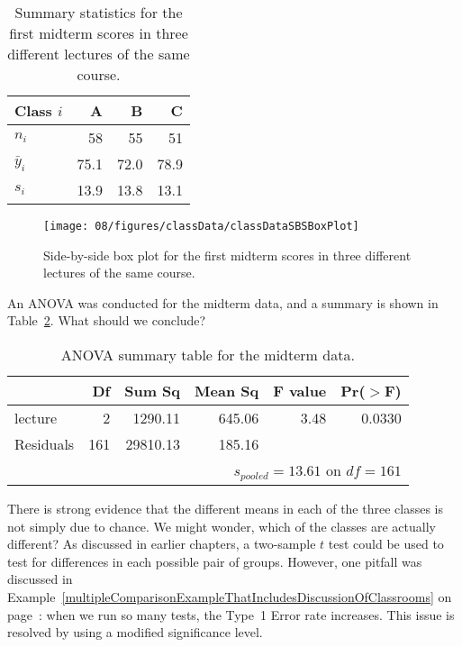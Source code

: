 \begin{table}[ht]
\centering
\begin{tabular}{lrrr}
  \hline
Class $i$	& A	& B	& C \\ 
  \hline
$n_i$		& 58	& 55	& 51 \\ 
$\bar{y}_i$	& 75.1	& 72.0	& 78.9 \\ 
$s_i$		& 13.9	& 13.8	& 13.1 \\ 
\hline
\end{tabular}
\caption{Summary statistics for the first midterm scores in three different lectures of the same course.}
\label{summaryStatisticsForClassTestData}
\end{table}

\begin{figure}[ht]
\centering
\texttt{[image: 08/figures/classData/classDataSBSBoxPlot]}
\caption{Side-by-side box plot for the first midterm scores in three different  lectures of the same course.}
\label{classDataSBSBoxPlot}
\end{figure}

\begin{exercise} \label{exerExaminingAnovaSummaryTableForMidtermData}
An ANOVA was conducted for the midterm data, and a summary is shown in Table~\ref{anovaSummaryTableForMidtermData}. What should we conclude?
\end{exercise}

\begin{table}[ht]
\centering
\begin{tabular}{lrrrrr}
  \hline
 & Df & Sum Sq & Mean Sq & F value & Pr($>$F) \\ 
  \hline
lecture & 2 & 1290.11 & 645.06 & 3.48 & 0.0330 \\ 
  Residuals & 161 & 29810.13 & 185.16 &  &  \\ 
   \hline
\multicolumn{6}{r}{$s_{pooled}=13.61$ on $df=161$}
\end{tabular}
\caption{ANOVA summary table for the midterm data.}
\label{anovaSummaryTableForMidtermData}
\end{table}

There is strong evidence that the different means in each of the three classes is not simply due to chance. We might wonder, which of the classes are actually different? As discussed in earlier chapters, a two-sample $t$ test could be used to test for differences in each possible pair of groups. However, one pitfall was discussed in Example~\ref{multipleComparisonExampleThatIncludesDiscussionOfClassrooms} on page~\pageref{multipleComparisonExampleThatIncludesDiscussionOfClassrooms}: when we run so many tests, the Type~1 Error rate increases. This issue is resolved by using a modified significance level.

